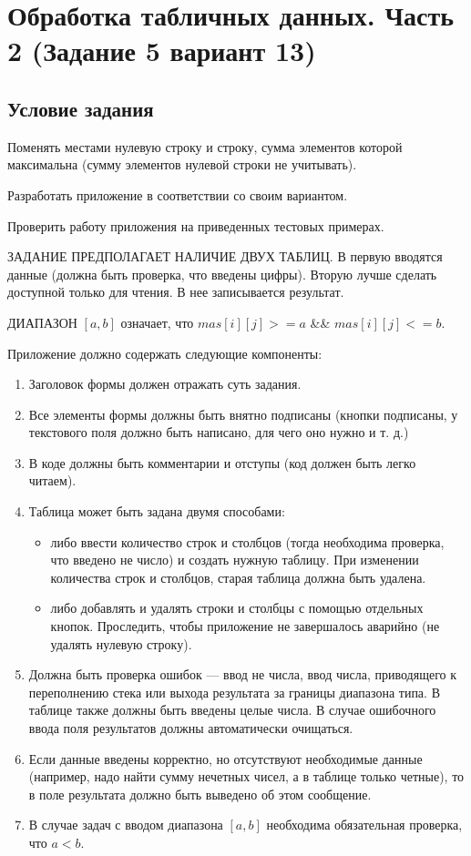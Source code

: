 \section{Обработка табличных данных. Часть 2 (Задание 5 вариант 13)}

\subsection{Условие задания}

Поменять местами нулевую строку и строку, сумма элементов которой максимальна (сумму элементов нулевой строки не учитывать).

Разработать приложение в соответствии со своим вариантом.

Проверить работу приложения на приведенных тестовых примерах.

ЗАДАНИЕ ПРЕДПОЛАГАЕТ НАЛИЧИЕ ДВУХ ТАБЛИЦ. В  первую вводятся данные (должна быть проверка, что введены цифры). Вторую лучше сделать доступной только для чтения. В нее записывается результат. 

ДИАПАЗОН $[a,b]$ означает, что $mas[i][j] >= a$ \&\& $mas[i][j] <= b$.

Приложение должно содержать следующие компоненты:

\begin{enumerate}
    \item{Заголовок формы должен отражать суть задания.}
    \item{Все элементы формы должны быть внятно подписаны (кнопки подписаны, у текстового поля должно быть написано, для чего оно нужно и т. д.)}
    \item{В коде должны быть комментарии и отступы (код должен быть легко читаем).}
    \item {Таблица может быть задана двумя способами:
    \begin{itemize}
        \item{либо ввести количество строк и столбцов (тогда необходима проверка, что введено не число) и создать нужную таблицу. При изменении количества строк и столбцов, старая таблица должна быть удалена.}
        \item{либо добавлять и удалять строки и столбцы с помощью отдельных кнопок. Проследить, чтобы приложение не завершалось аварийно (не удалять нулевую строку).}
    \end{itemize}
    }
    \item{Должна быть проверка ошибок --- ввод не числа, ввод числа, приводящего к переполнению стека или выхода результата за границы диапазона типа. В таблице также должны быть введены целые числа. В случае ошибочного ввода поля результатов должны автоматически очищаться.}
    \item{Если данные введены корректно, но отсутствуют необходимые данные (например, надо найти сумму нечетных чисел, а в таблице только четные), то в поле результата должно быть выведено об этом сообщение.}
    \item{В случае задач с вводом диапазона $[a,b]$ необходима обязательная проверка, что $a < b$.}
\end{enumerate}

